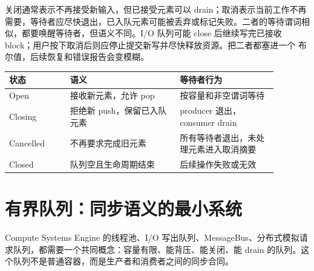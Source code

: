 关闭通常表示不再接受新输入，但已接受元素可以 drain；取消表示当前工作不再需要，等待者应尽快退出，已入队元素可能被丢弃或标记失败。二者的等待谓词相似，都要唤醒等待者，但语义不同。I/O 队列可能 close 后继续写完已接收 block；用户按下取消后则应停止提交新写并尽快释放资源。把二者都塞进一个  布尔值，后续恢复和错误报告会变模糊。

\begin{center}
\begin{tabular}{p{0.20\linewidth}p{0.36\linewidth}p{0.32\linewidth}}
\toprule
状态 & 语义 & 等待者行为 \\
\midrule
Open & 接收新元素，允许 pop & 按容量和非空谓词等待 \\
Closing & 拒绝新 push，保留已入队元素 & producer 退出，consumer drain \\
Cancelled & 不再要求完成旧元素 & 所有等待者退出，未处理元素进入取消摘要 \\
Closed & 队列空且生命周期结束 & 后续操作失败或无效 \\
\bottomrule
\end{tabular}
\end{center}

\section{有界队列：同步语义的最小系统}

Compute Systems Engine 的线程池、I/O 写出队列、MessageBus、分布式模拟请求队列，都需要一个共同概念：容量有限、能背压、能关闭、能 drain 的队列。这个队列不是普通容器，而是生产者和消费者之间的同步合同。

